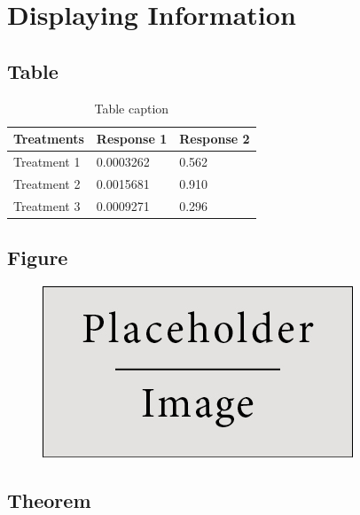 \section{Displaying Information}
\label{section2}

\clearpage


\subsection{Table}

\begin{table}[h]
    \centering
    \begin{tabular}{l l l}
        \toprule
        \textbf{Treatments} & \textbf{Response 1} & \textbf{Response 2}\\
        \midrule
        Treatment 1 & 0.0003262 & 0.562 \\
        Treatment 2 & 0.0015681 & 0.910 \\
        Treatment 3 & 0.0009271 & 0.296 \\
        \bottomrule
    \end{tabular}
    \caption{Table caption}
\end{table}

\clearpage


\subsection{Figure}

\begin{figure}[h]
    \centering
    \includegraphics[width=0.4\linewidth]{Figures/placeholder}
\end{figure}

\clearpage


\subsection{Theorem}

